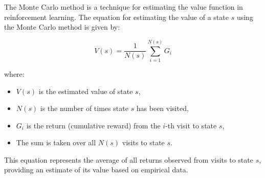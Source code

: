 \documentclass{article}
\begin{document}
The Monte Carlo method is a technique for estimating the value function in reinforcement learning. The equation for estimating the value of a state $s$ using the Monte Carlo method is given by:

\[
V(s) = \frac{1}{N(s)} \sum_{i=1}^{N(s)} G_i
\]

where:
\begin{itemize}
    \item $V(s)$ is the estimated value of state $s$,
    \item $N(s)$ is the number of times state $s$ has been visited,
    \item $G_i$ is the return (cumulative reward) from the $i$-th visit to state $s$,
    \item The sum is taken over all $N(s)$ visits to state $s$.
\end{itemize}

This equation represents the average of all returns observed from visits to state $s$, providing an estimate of its value based on empirical data.
\end{document}
